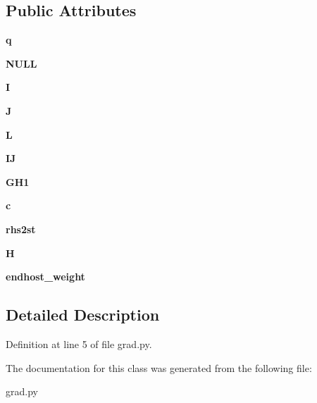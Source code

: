 \subsection*{Public Attributes}
\begin{DoxyCompactItemize}
\item 
\hypertarget{classgrad_1_1Netcal_ad7bed3f395e8d0d9b95f034be56bd768}{
{\bfseries q}}
\label{classgrad_1_1Netcal_ad7bed3f395e8d0d9b95f034be56bd768}

\item 
\hypertarget{classgrad_1_1Netcal_a657de06ee1c1d95906c48161c4f9e2dd}{
{\bfseries NULL}}
\label{classgrad_1_1Netcal_a657de06ee1c1d95906c48161c4f9e2dd}

\item 
\hypertarget{classgrad_1_1Netcal_af7b0d52735f5769025bf89762442a853}{
{\bfseries I}}
\label{classgrad_1_1Netcal_af7b0d52735f5769025bf89762442a853}

\item 
\hypertarget{classgrad_1_1Netcal_ab7e09564bc8b02bf9f16ec4f6ea213e2}{
{\bfseries J}}
\label{classgrad_1_1Netcal_ab7e09564bc8b02bf9f16ec4f6ea213e2}

\item 
\hypertarget{classgrad_1_1Netcal_a3a37aa671856c3ddd78f709953a48256}{
{\bfseries L}}
\label{classgrad_1_1Netcal_a3a37aa671856c3ddd78f709953a48256}

\item 
\hypertarget{classgrad_1_1Netcal_a4421d54905c5f09cf80f9352fe147cc1}{
{\bfseries IJ}}
\label{classgrad_1_1Netcal_a4421d54905c5f09cf80f9352fe147cc1}

\item 
\hypertarget{classgrad_1_1Netcal_aef949c034ab9b6eb5aee8adfe65794ef}{
{\bfseries GH1}}
\label{classgrad_1_1Netcal_aef949c034ab9b6eb5aee8adfe65794ef}

\item 
\hypertarget{classgrad_1_1Netcal_adf2d65ca7110ab432c368923ae7d4eed}{
{\bfseries c}}
\label{classgrad_1_1Netcal_adf2d65ca7110ab432c368923ae7d4eed}

\item 
\hypertarget{classgrad_1_1Netcal_aecb435b78c6b25df6b8cfaf830ac4d8f}{
{\bfseries rhs2st}}
\label{classgrad_1_1Netcal_aecb435b78c6b25df6b8cfaf830ac4d8f}

\item 
\hypertarget{classgrad_1_1Netcal_a1d21b881e9c77d57b64c1a9f1600a356}{
{\bfseries H}}
\label{classgrad_1_1Netcal_a1d21b881e9c77d57b64c1a9f1600a356}

\item 
\hypertarget{classgrad_1_1Netcal_a971b97e266249df5f2db280c136458d4}{
{\bfseries endhost\_\-weight}}
\label{classgrad_1_1Netcal_a971b97e266249df5f2db280c136458d4}

\end{DoxyCompactItemize}


\subsection{Detailed Description}


Definition at line 5 of file grad.py.



The documentation for this class was generated from the following file:\begin{DoxyCompactItemize}
\item 
grad.py\end{DoxyCompactItemize}
